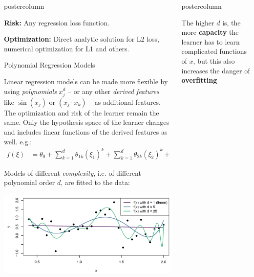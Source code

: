 \documentclass{beamer}
\newlength{\columnheight} %
\begin{document}
\begin{frame}[fragile]{}
\begin{columns}
\begin{column}{.31\textwidth}
\begin{beamercolorbox}[center]{postercolumn}
\begin{minipage}{.98\textwidth}
{\begin{myblock}{ }
  \vspace*{1ex}
  
  \textbf{Risk:} Any regression loss function.
  
  \vspace*{1ex}
  
  \textbf{Optimization:} Direct analytic solution for L2 loss, numerical optimization for L1 and others.
  \end{myblock}
  
  \begin{myblock}{Polynomial Regression Models}
  
  Linear regression models can be made more flexible by using \emph{polynomials} $x_j^d$ -- or any other \emph{derived features} like $\sin(x_j)$ or $(x_j \cdot x_k)$ -- as additional features. The optimization and risk of the learner remain the same.\vspace*{1ex}
  Only the hypothesis space of the learner changes and includes linear functions of the derived features as well. e.g.:
    \begin{align*}
  f(\xi) &= \theta_0 + \sum^d_{k=1} \theta_{1k} \left(\xi_1\right)^k + \sum^d_{k=1} \theta_{2k} \left(\xi_2\right)^k + \dots
  \end{align*}
  
  Models of different \emph{complexity}, i.e. of different polynomial order $d$, are fitted to the data:
  
  \includegraphics[width=0.91\columnwidth]{img/poly_reg.PNG}
  
  \end{myblock}
}
\end{minipage}
\end{beamercolorbox}
\end{column}
\begin{column}{.31\textwidth}
\begin{beamercolorbox}[center]{postercolumn}
\begin{minipage}{.98\textwidth}
\parbox[t][\columnheight]{\textwidth}{
  \begin{myblock}{ }
  The higher $d$ is, the more \textbf{capacity} the learner has to learn complicated functions of $x$, but
  this also increases the danger of \textbf{overfitting}
  

\end{myblock}}
\end{minipage}
\end{beamercolorbox}
\end{column}
\end{columns}
\end{frame}
\end{document}
